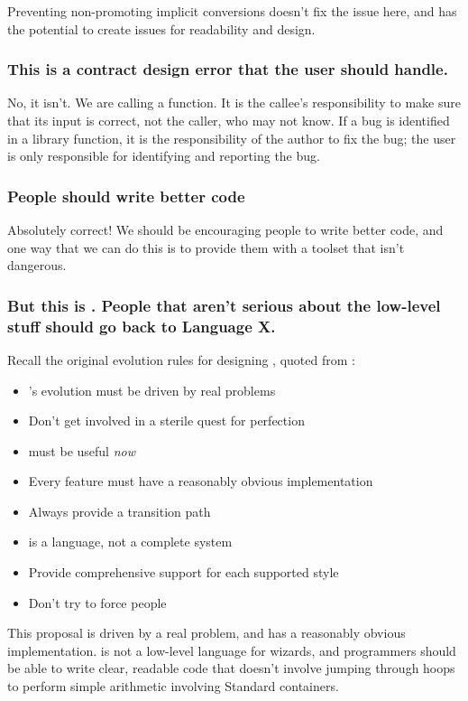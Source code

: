 Preventing non-promoting implicit conversions doesn't fix the issue here, and has the potential to
create issues for readability and design.

\subsubsection*{This is a contract design error that the user should handle.}
No, it isn't. We are calling a function. It is the callee's responsibility to make sure that its
input is correct, not the caller, who may not know. If a bug is identified in a library function, it
is the responsibility of the author to fix the bug; the user is only responsible for identifying and
reporting the bug.

\subsubsection*{People should write better code}
Absolutely correct! We should be encouraging people to write better code, and one way that we can do
this is to provide them with a toolset that isn't dangerous.

\subsubsection*{But this is \Cpp. People that aren't serious about the low-level stuff should go
back to Language X.}
Recall the original evolution rules for designing \Cpp, quoted from \cite{stroustrup94}:
\begin{itemize}
   \item \Cpp's evolution must be driven by real problems
   \item Don't get involved in a sterile quest for perfection
   \item \Cpp must be useful \textit{now}
   \item Every feature must have a reasonably obvious implementation
   \item Always provide a transition path
   \item \Cpp is a language, not a complete system
   \item Provide comprehensive support for each supported style
   \item Don't try to force people
\end{itemize}

This proposal is driven by a real problem, and has a reasonably obvious implementation. \Cpp is not
a low-level language for wizards, and programmers should be able to write clear, readable code that
doesn't involve jumping through hoops to perform simple arithmetic involving Standard containers.

